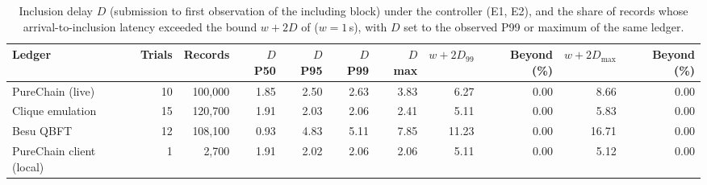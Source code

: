 \begin{table}[t]
\centering
\scriptsize
\caption{Inclusion delay $D$ (submission to first observation of the including block) under the controller (E1, E2), and the share of records whose arrival-to-inclusion latency exceeded the bound $w+2D$ of  ($w=1$\,s), with $D$ set to the observed P99 or maximum of the same ledger.}
\label{tab:delay}
\begin{adjustbox}{max width=\textwidth}
\begin{tabular}{lrrrrrrrrrr}
\toprule
Ledger & Trials & Records & $D$ P50 & $D$ P95 & $D$ P99 & $D$ max & $w{+}2D_{99}$ & Beyond (\%) & $w{+}2D_{\max}$ & Beyond (\%) \\
\midrule
PureChain (live) & 10 & 100,000 & 1.85 & 2.50 & 2.63 & 3.83 & 6.27 & 0.00 & 8.66 & 0.00 \\
Clique emulation & 15 & 120,700 & 1.91 & 2.03 & 2.06 & 2.41 & 5.11 & 0.00 & 5.83 & 0.00 \\
Besu QBFT & 12 & 108,100 & 0.93 & 4.83 & 5.11 & 7.85 & 11.23 & 0.00 & 16.71 & 0.00 \\
PureChain client (local) & 1 & 2,700 & 1.91 & 2.02 & 2.06 & 2.06 & 5.11 & 0.00 & 5.12 & 0.00 \\
\bottomrule
\end{tabular}\end{adjustbox}
\end{table}
